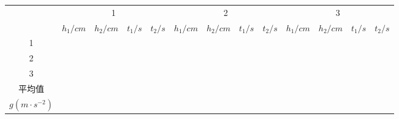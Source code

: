 \documentclass{ctexart}
\begin{document}
\begin{table}[]
\begin{tabular}{|c|cccc|cccc|cccc|}
\hline
\multirow{2}{*}{} & \multicolumn{4}{c|}{1}                                                                     & \multicolumn{4}{c|}{2}                                                                     & \multicolumn{4}{c|}{3}                                                                     \\ \cline{2-13} 
                  & \multicolumn{1}{c|}{$h_1/cm$} & \multicolumn{1}{c|}{$h_2/cm$} & \multicolumn{1}{c|}{$t_1/s$} & $t_2/s$ & \multicolumn{1}{c|}{$h_1/cm$} & \multicolumn{1}{c|}{$h_2/cm$} & \multicolumn{1}{c|}{$t_1/s$} & $t_2/s$ & \multicolumn{1}{c|}{$h_1/cm$} & \multicolumn{1}{c|}{$h_2/cm$} & \multicolumn{1}{c|}{$t_1/s$} & $t_2/s$ \\ \hline
1                 & \multicolumn{1}{c|}{}      & \multicolumn{1}{c|}{}      & \multicolumn{1}{c|}{}     &      & \multicolumn{1}{c|}{}      & \multicolumn{1}{c|}{}      & \multicolumn{1}{c|}{}     &      & \multicolumn{1}{c|}{}      & \multicolumn{1}{c|}{}      & \multicolumn{1}{c|}{}     &      \\ \hline
2                 & \multicolumn{1}{c|}{}      & \multicolumn{1}{c|}{}      & \multicolumn{1}{c|}{}     &      & \multicolumn{1}{c|}{}      & \multicolumn{1}{c|}{}      & \multicolumn{1}{c|}{}     &      & \multicolumn{1}{c|}{}      & \multicolumn{1}{c|}{}      & \multicolumn{1}{c|}{}     &      \\ \hline
3                 & \multicolumn{1}{c|}{}      & \multicolumn{1}{c|}{}      & \multicolumn{1}{c|}{}     &      & \multicolumn{1}{c|}{}      & \multicolumn{1}{c|}{}      & \multicolumn{1}{c|}{}     &      & \multicolumn{1}{c|}{}      & \multicolumn{1}{c|}{}      & \multicolumn{1}{c|}{}     &      \\ \hline
平均值               & \multicolumn{1}{c|}{}      & \multicolumn{1}{c|}{}      & \multicolumn{1}{c|}{}     &      & \multicolumn{1}{c|}{}      & \multicolumn{1}{c|}{}      & \multicolumn{1}{c|}{}     &      & \multicolumn{1}{c|}{}      & \multicolumn{1}{c|}{}      & \multicolumn{1}{c|}{}     &      \\ \hline
$g(m\cdot s^{-2})$                 & \multicolumn{1}{c|}{}      & \multicolumn{1}{c|}{}      & \multicolumn{1}{c|}{}     &      & \multicolumn{1}{c|}{}      & \multicolumn{1}{c|}{}      & \multicolumn{1}{c|}{}     &      & \multicolumn{1}{c|}{}      & \multicolumn{1}{c|}{}      & \multicolumn{1}{c|}{}     &      \\ \hline
\end{tabular}
\end{table}
\end{document}
